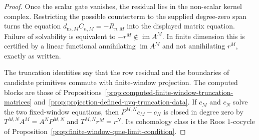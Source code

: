 \begin{proof}
  Once the scalar gate vanishes, the residual lies in the non-scalar kernel
  complex.  Restricting the possible counterterm to the supplied degree-zero
  span turns the equation
  \(d_{\mathrm{ns},M}C_{n,M}=-R_{n,M}\) into the displayed matrix equation.
  Failure of solvability is equivalent to \(-r^M\notin\operatorname{im}A^M\).
  In finite dimension this is certified by a linear functional annihilating
  \(\operatorname{im}A^M\) and not annihilating \(r^M\), exactly as written.

  The truncation identities say that the row residual and the boundaries of
  candidate primitives commute with finite-window projection.  The computed
  blocks are those of
  Propositions~\ref{prop:computed-finite-window-truncation-matrices}
  and~\ref{prop:projection-defined-uvq-truncation-data}.  If \(c_M\) and \(c_N\)
  solve the two fixed-window equations, then
  \(P^{M,N}c_M-c_N\) is closed in degree zero by
  \(T^{M,N}A^M=A^N P^{M,N}\) and \(T^{M,N}r^M=r^N\).  Its cohomology class is
  the Roos \(1\)-cocycle of
  Proposition~\ref{prop:finite-window-qme-limit-condition}.
\end{proof}

